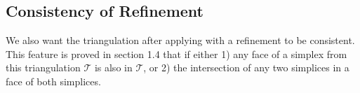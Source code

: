     
    \subsection{Consistency of Refinement}
    We also want the triangulation after applying with a refinement to be consistent. This feature is proved in section 1.4 that if either 1) any face of a simplex from this triangulation $\mathcal{T}$ is also in $\mathcal{T}$, or 2) the intersection of any two simplices in a face of both simplices.